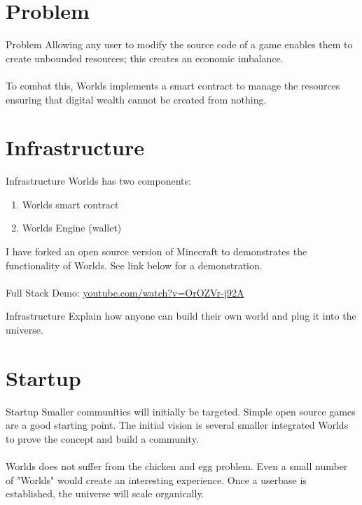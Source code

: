 \documentclass[final, xcolor=pdftex, dvipsnames, table, aspectratio=169, 14pt]{beamer}
\begin{document}
\section{Problem}
\begin{frame}{Problem}
Allowing any user to modify the source code of a game enables them to create unbounded resources; this creates an economic imbalance. 
\\~\\
To combat this, Worlds implements a smart contract to manage the resources ensuring that digital wealth cannot be created from nothing.  
\end{frame}

\section{Infrastructure}
\begin{frame}{Infrastructure}
Worlds has two components: 
\begin{enumerate}
\item Worlds smart contract
\item Worlds Engine (wallet)
\end{enumerate}
\vfill 
I have forked an open source version of Minecraft to demonstrates the functionality of Worlds. See link below for a demonstration.
\\~\\
\footnotesize
Full Stack Demo:
\href{https://www.youtube.com/watch?v=OrOZVr-j92A}{youtube.com/watch?v=OrOZVr-j92A}\label{vid}

\end{frame}

\begin{frame}{Infrastructure}
Explain how anyone can build their own world and plug it into the universe.
\end{frame}

\section{Startup}
\begin{frame}{Startup}
Smaller communities will initially be targeted. Simple open source games are a good starting point. The initial vision is several smaller integrated Worlds to prove the concept and build a community.
\\~\\
Worlds does not suffer from the chicken and egg problem. Even a small number of "Worlds" would create an interesting experience. Once a userbase is established, the universe will scale organically.
\end{frame}
\end{document}
